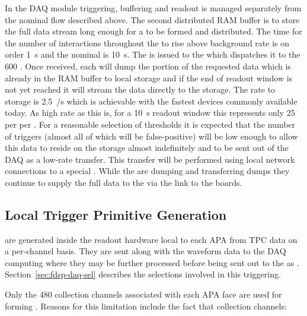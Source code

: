In the  DAQ module  triggering, buffering and
readout is managed separately from the nominal flow described above. 
The second distributed RAM buffer is to store the full data stream
long enough for a   to be formed and
distributed. 
The time for the number of  interactions throughout the
  to rise above background rate is on order
\SI{1}{\s} and the nominal   is
\SI{10}{\s}. 
The   is issued to the  which
dispatches it to the 600 . 
Once received, each  will dump the portion of the requested
data which is already in the RAM buffer to local  storage
and if the end of readout window is not yet reached it will stream the
data directly to the  storage.
The rate to  storage is \SI{2.5}{\GB/\s} which is
achievable with the fastest devices commonly available today. 
As high rate as this is, for a \SI{10}{\s}  readout window
this represents only \SI{25}{\GB} per  per .
For a reasonable selection of thresholds it is expected that the
number of  triggers (almost all of which will be
false-positive) will be low enough to allow this data to reside on the
 storage almost indefinitely and to be sent out of the DAQ
as a low-rate transfer.
This transfer will be performed using local network connections to a
special  .
While the  are dumping and transferring  dumps
they continue to supply the full data to the  via the link
to the  boards.


\subsection{Local Trigger Primitive Generation}
\label{sec:fdsp-daq-ltp}


 are generated inside the  readout
hardware local to each APA from TPC data on a per-channel basis.
They are sent along with the waveform data to the  DAQ
computing where they may be further processed before being sent out to
the  as .  
Section~\ref{sec:fdsp-daq-sel} describes the selections involved in
this triggering.

Only the 480 collection channels associated with each APA face are
used for forming . 
Reasons for this limitation include the fact that collection
channels:

